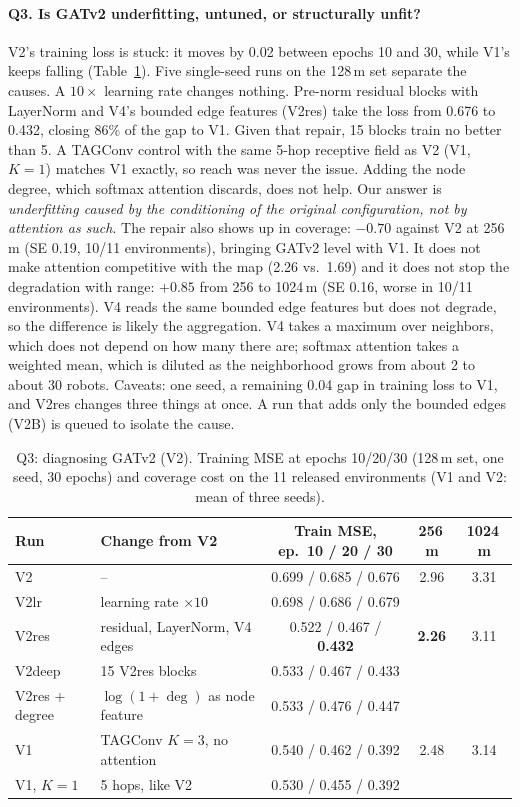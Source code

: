 \documentclass{article}
\begin{document}
\paragraph{Q3. Is GATv2 underfitting, untuned, or structurally unfit?} V2's training loss is stuck: it moves by 0.02 between epochs 10 and 30, while V1's keeps falling (Table~\ref{tab:gat}). Five single-seed runs on the 128\,m set separate the causes. A $10\times$ learning rate changes nothing. Pre-norm residual blocks with LayerNorm and V4's bounded edge features (V2res) take the loss from 0.676 to 0.432, closing 86\% of the gap to V1. Given that repair, 15 blocks train no better than 5. A TAGConv control with the same 5-hop receptive field as V2 (V1, $K{=}1$) matches V1 exactly, so reach was never the issue. Adding the node degree, which softmax attention discards, does not help. Our answer is \emph{underfitting caused by the conditioning of the original configuration, not by attention as such}. The repair also shows up in coverage: $-0.70$ against V2 at 256\,m (SE 0.19, 10/11 environments), bringing GATv2 level with V1. It does not make attention competitive with the map (2.26 vs.\ 1.69) and it does not stop the degradation with range: $+0.85$ from 256 to 1024\,m (SE 0.16, worse in 10/11 environments). V4 reads the same bounded edge features but does not degrade, so the difference is likely the aggregation. V4 takes a maximum over neighbors, which does not depend on how many there are; softmax attention takes a weighted mean, which is diluted as the neighborhood grows from about 2 to about 30 robots. Caveats: one seed, a remaining 0.04 gap in training loss to V1, and V2res changes three things at once. A run that adds only the bounded edges (V2B) is queued to isolate the cause.

\begin{table}[t]
\centering
\small
\caption{Q3: diagnosing GATv2 (V2). Training MSE at epochs 10/20/30 (128\,m set, one seed, 30 epochs) and coverage cost on the 11 released environments (V1 and V2: mean of three seeds).}
\label{tab:gat}
\begin{tabular}{llccc}
\toprule
Run & Change from V2 & Train MSE, ep.\ 10 / 20 / 30 & 256\,m & 1024\,m \\
\midrule
V2 & -- & 0.699 / 0.685 / 0.676 & 2.96 & 3.31 \\
V2lr & learning rate $\times10$ & 0.698 / 0.686 / 0.679 & & \\
V2res & residual, LayerNorm, V4 edges &0.522 / 0.467 / \textbf{0.432} & \textbf{2.26} & 3.11 \\
V2deep & 15 V2res blocks & 0.533 / 0.467 / 0.433 & & \\
V2res + degree & $\log(1+\deg)$ as node feature & 0.533 / 0.476 / 0.447 & & \\
\midrule
V1 & TAGConv $K{=}3$, no attention & 0.540 / 0.462 / 0.392 & 2.48 & 3.14 \\
V1, $K{=}1$ & 5 hops, like V2 & 0.530 / 0.455 / 0.392 & & \\
\bottomrule
\end{tabular}
\end{table}
\end{document}

